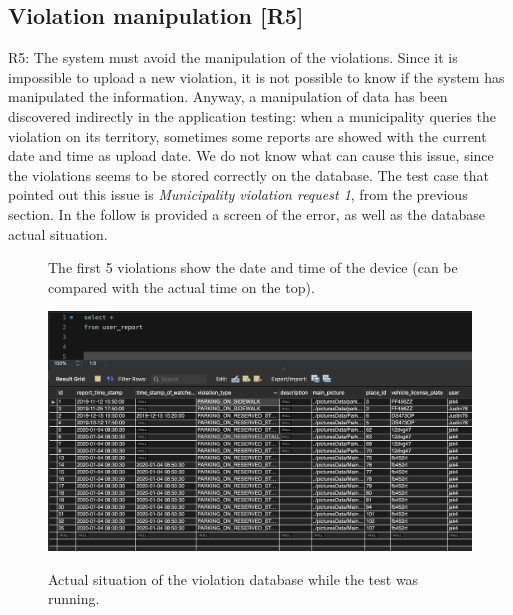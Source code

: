 \documentclass[../ATD.tex]{subfiles}
\begin{document}
    \subsection{Violation manipulation [R5]}\label{subsec:violation-manipulation.}
    R5: The system must avoid the manipulation of the violations.
    \newline
    Since it is impossible to upload a new violation, it is not possible to know if the system has manipulated the information.
    Anyway, a manipulation of data has been discovered indirectly in the application testing: when a municipality queries the violation on its territory, sometimes some reports are showed with the current date and time as upload date.
    We do not know what can cause this issue, since the violations seems to be stored correctly on the database.
    The test case that pointed out this issue is \textit{Municipality violation request 1}, from the previous section.
    In the follow is provided a screen of the error, as well as the database actual situation.

    \begin{figure}[H]
        \centering
        \caption[Violation manipulation]{The first 5 violations show the date and time of the device (can be compared with the actual time on the top).}
    \end{figure}

    \begin{figure}[H]
        \centering
        \includegraphics[scale = 0.5]{assets/database_user_report.png}\\
        \caption[Situation of the database]{Actual situation of the violation database while the test was running.}
    \end{figure}
\end{document}
